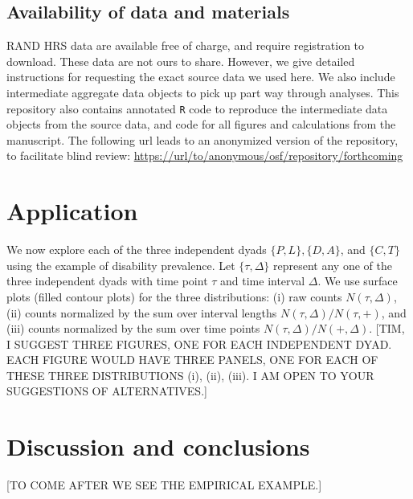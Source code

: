 \documentclass{bmcart}
\begin{document}
\subsection*{Availability of data and materials}
RAND HRS data are available free of charge, and require registration to download. These data are not ours to share. However, we give detailed instructions for requesting the exact source data we used here. We also include intermediate aggregate data objects to pick up part way through analyses. This repository also contains annotated \texttt{R} code to reproduce the intermediate data objects from the source data, and code for all figures and calculations from the manuscript.
The following url leads to an anonymized version of the repository, to facilitate blind review:
\url{https://url/to/anonymous/osf/repository/forthcoming}

\section*{Application}
We now explore each of the three independent dyads $\{P,L\},\{D,A\}$, and $\{C,T\}$ 
using the example of disability prevalence. 
Let $\{\tau,\Delta \}$ represent any one of the three independent dyads 
with time point $\tau$ and time interval $\Delta$. 
We use surface plots (filled contour plots) for the three distributions:
(i) raw counts $N(\tau,\Delta)$, 
(ii) counts normalized by the sum over interval lengths $N(\tau,\Delta)/N(\tau,+)$,
and (iii) counts normalized by the sum over time points $N(\tau,\Delta)/N(+,\Delta)$.
[TIM, I SUGGEST THREE FIGURES, ONE FOR EACH INDEPENDENT DYAD. 
EACH FIGURE WOULD HAVE THREE PANELS, ONE FOR EACH OF THESE THREE DISTRIBUTIONS
(i), (ii), (iii).
I AM OPEN TO YOUR SUGGESTIONS OF ALTERNATIVES.]

\section*{Discussion and conclusions}

[TO COME AFTER WE SEE THE EMPIRICAL EXAMPLE.]


\end{document}
